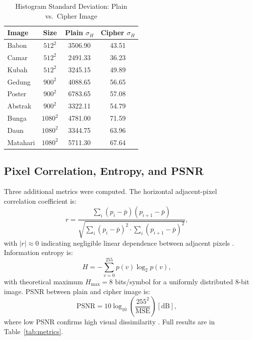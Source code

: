 \documentclass[conference]{IEEEtran}
\begin{document}
\begin{table}[htbp]
	\caption{Histogram Standard Deviation: Plain vs.\ Cipher Image}
	\label{tab:histogram}
	\begin{center}
		\begin{tabular}{|l|c|c|c|}
			\hline
			\textbf{Image} & \textbf{Size} & \textbf{Plain $\sigma_H$} & \textbf{Cipher $\sigma_H$} \\
			\hline
			Babon    & $512^2$   & 3506.90 & 43.51 \\
			Camar    & $512^2$   & 2491.33 & 36.23 \\
			Kubah    & $512^2$   & 3245.15 & 49.89 \\
			Gedung   & $900^2$   & 4088.65 & 56.65 \\
			Poster   & $900^2$   & 6783.65 & 57.08 \\
			Abstrak  & $900^2$   & 3322.11 & 54.79 \\
			Bunga    & $1080^2$  & 4781.00 & 71.59 \\
			Daun     & $1080^2$  & 3344.75 & 63.96 \\
			Matahari & $1080^2$  & 5711.30 & 67.64 \\
			\hline
		\end{tabular}
	\end{center}
\end{table}

\subsection{Pixel Correlation, Entropy, and PSNR}

Three additional metrics were computed. The horizontal adjacent-pixel correlation coefficient is:
\begin{equation}
	r = \frac{\sum_i (p_i - \bar{p})(p_{i+1} - \bar{p})}
	{\sqrt{\sum_i (p_i - \bar{p})^2 \cdot \sum_i (p_{i+1} - \bar{p})^2}},
	\label{eq:corr}
\end{equation}
with $|r| \approx 0$ indicating negligible linear dependence between adjacent pixels \cite{b14}. Information entropy is:
\begin{equation}
	H = -\sum_{v=0}^{255} p(v)\log_2 p(v),
	\label{eq:entropy}
\end{equation}
with theoretical maximum $H_\mathrm{max} = 8$ bits/symbol for a uniformly distributed 8-bit image. PSNR between plain and cipher image is:
\begin{equation}
	\mathrm{PSNR} = 10\log_{10}\!\left(\frac{255^2}{\mathrm{MSE}}\right)[\mathrm{dB}],
	\label{eq:psnr}
\end{equation}
where low PSNR confirms high visual dissimilarity \cite{b12}. Full results are in Table~\ref{tab:metrics}.
\end{document}
